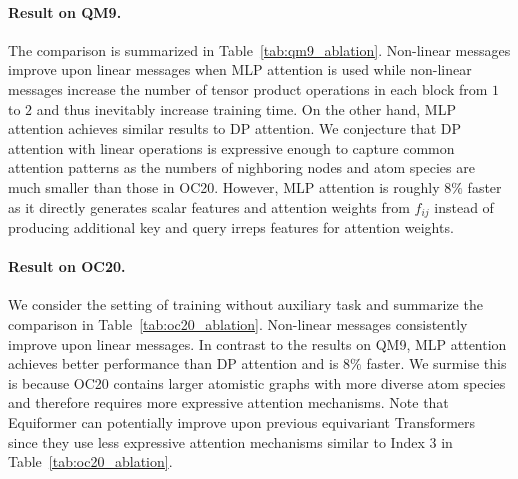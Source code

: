 \vspace{-3.25mm}
\paragraph{Result on QM9.}
The comparison is summarized in Table~\ref{tab:qm9_ablation}.
Non-linear messages improve upon linear messages when MLP attention is used while non-linear messages increase the number of tensor product operations in each block from $1$ to $2$ and thus inevitably increase training time.
On the other hand, MLP attention achieves similar results to DP  attention.
We conjecture that DP attention with linear operations is expressive enough to capture common attention patterns as the numbers of nighboring nodes and atom species are much smaller than those in OC20.
However, MLP attention is roughly $8\%$ faster as it directly generates scalar features and attention weights from $f_{ij}$ instead of producing additional key and query irreps features for attention weights.

\vspace{-3.25mm}
\paragraph{Result on OC20.}
We consider the setting of training without auxiliary task and summarize the comparison in Table~\ref{tab:oc20_ablation}.
Non-linear messages consistently improve upon linear messages.
In contrast to the results on QM9, MLP attention achieves better performance than DP attention and is $8\%$ faster.
We surmise this is because OC20 contains larger atomistic graphs with more diverse atom species and therefore requires more expressive attention mechanisms.
Note that Equiformer can potentially improve upon previous equivariant Transformers~\citep{se3_transformer, torchmd_net, eqgat} since they use less expressive attention mechanisms similar to Index 3 in Table~\ref{tab:oc20_ablation}.